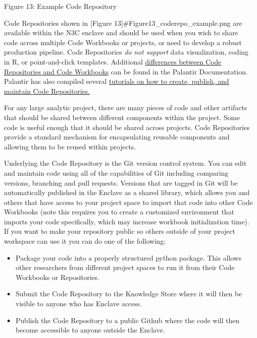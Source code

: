 \documentclass[
  letterpaper,
  DIV=11,
  numbers=noendperiod]{scrreprt}
\providecommand{\tightlist}{%
  \setlength{\itemsep}{0pt}\setlength{\parskip}{0pt}}\usepackage{longtable,booktabs,array}
\begin{document}
Figure 13: Example Code Repository

Code Repositories shown in {[}Figure
13{]}\#Figure13\_coderepo\_example.png are available within the N3C
enclave and should be used when you wish to share code across multiple
Code Workbooks or projects, or need to develop a robust production
pipeline. Code Repositories \emph{{do not support}} data visualization,
coding in R, or point-and-click templates. Additional
\href{https://www.palantir.com/docs/foundry/code-workbook/code-repositories-comparison/}{differences
between Code Repositories and Code Workbooks} can be found in the
Palantir Documentation. Palantir has also compiled several
\href{https://unite.nih.gov/workspace/documentation/product/foundry-training-portal/de_code-repo-environment_module1}{tutorials
on how to create, publish, and maintain Code Repositories.}

For any large analytic project, there are many pieces of code and other
artifacts that should be shared between different components within the
project. Some code is useful enough that it should be shared across
projects. Code Repositories provide a standard mechanism for
encapsulating reusable components and allowing them to be reused within
projects.

Underlying the Code Repository is the Git version control system. You
can edit and maintain code using all of the capabilities of Git
including comparing versions, branching and pull requests. Versions that
are tagged in Git will be automatically published in the Enclave as a
shared library, which allows you and others that have access to your
project space to import that code into other Code Workbooks (note this
requires you to create a customized environment that imports your code
specifically, which may increase workbook initialization time). If you
want to make your repository public so others outside of your project
workspace can use it you can do one of the following:

\begin{itemize}
\tightlist
\item
  Package your code into a properly structured python package. This
  allows other researchers from different project spaces to run it from
  their Code Workbooks or Repositories.
\item
  Submit the Code Repository to the Knowledge Store where it will then
  be visible to anyone who has Enclave access.
\item
  Publish the Code Repository to a public Github where the code will
  then become accessible to anyone outside the Enclave.
\end{itemize}
\end{document}
